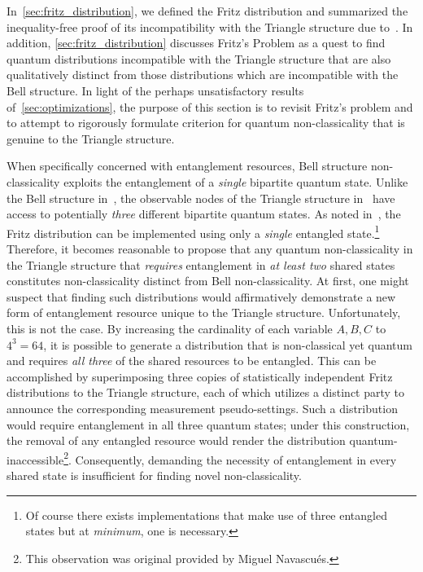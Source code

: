 \documentclass[aps, 10pt, english, twoside, pra, nofootinbib, tightenlines, longbibliography, superscriptaddress]{revtex4-1}
\begin{document}
    In~\cref{sec:fritz_distribution}, we defined the Fritz distribution and summarized the inequality-free proof of its     incompatibility with the Triangle structure due to~\cite{Fritz_2012}. In addition, \cref{sec:fritz_distribution} discusses Fritz's Problem as a quest to find quantum distributions incompatible with the Triangle structure that are also qualitatively distinct from those distributions which are incompatible with the Bell structure. In light of the perhaps unsatisfactory results of~\cref{sec:optimizations}, the purpose of this section is to revisit Fritz's problem and to attempt to rigorously formulate criterion for quantum non-classicality that is genuine to the Triangle structure.

    When specifically concerned with entanglement resources, Bell structure non-classicality exploits the entanglement of a \textit{single} bipartite quantum state. Unlike the Bell structure in~, the observable nodes of the Triangle structure in~ have access to potentially \textit{three} different bipartite quantum states. As noted in~\cite{Fritz_2012}, the Fritz distribution can be implemented using only a \textit{single} entangled state.\footnote{Of course there exists implementations that make use of three entangled states but at \textit{minimum}, one is necessary.} Therefore, it becomes reasonable to propose that any quantum non-classicality in the Triangle structure that \textit{requires} entanglement in \textit{at least two} shared states constitutes non-classicality distinct from Bell non-classicality. At first, one might suspect that finding such distributions would affirmatively demonstrate a new form of entanglement resource unique to the Triangle structure. Unfortunately, this is not the case. By increasing the cardinality of each variable $A, B, C$ to $4^{3} = 64$, it is possible to generate a distribution that is non-classical yet quantum and requires \textit{all three} of the shared resources to be entangled. This can be accomplished by superimposing three copies of statistically independent Fritz distributions to the Triangle structure, each of which utilizes a distinct party to announce the corresponding measurement pseudo-settings. Such a distribution would require entanglement in all three quantum states; under this construction, the removal of any entangled resource would render the distribution quantum-inaccessible\footnote{This observation was original provided by Miguel Navascués.}. Consequently, demanding the necessity of entanglement in every shared state is insufficient for finding novel non-classicality.
\end{document}
